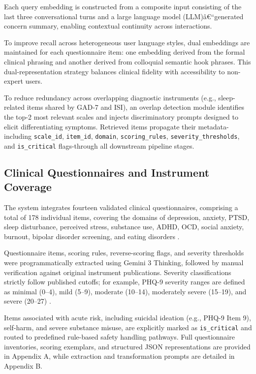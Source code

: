 ﻿\documentclass[acmsmall,screen]{acmart}
\begin{document}
Each query embedding is constructed from a composite input consisting of the last three conversational turns and a large language model (LLM)â€“generated concern summary, enabling contextual continuity across interactions.

To improve recall across heterogeneous user language styles, dual embeddings are maintained for each questionnaire item: one embedding derived from the formal clinical phrasing and another derived from colloquial semantic hook phrases. This dual-representation strategy balances clinical fidelity with accessibility to non-expert users.

To reduce redundancy across overlapping diagnostic instruments (e.g., sleep-related items shared by GAD-7 and ISI), an overlap detection module identifies the top-2 most relevant scales and injects discriminatory prompts designed to elicit differentiating symptoms. Retrieved items propagate their metadata-including \texttt{scale\_id}, \texttt{item\_id}, \texttt{domain}, \texttt{scoring\_rules}, \texttt{severity\_thresholds}, and \texttt{is\_critical} flags-through all downstream pipeline stages.

\subsection{Clinical Questionnaires and Instrument Coverage}
The system integrates fourteen validated clinical questionnaires, comprising a total of 178 individual items, covering the domains of depression, anxiety, PTSD, sleep disturbance, perceived stress, substance use, ADHD, OCD, social anxiety, burnout, bipolar disorder screening, and eating disorders \cite{24,25,26,27,28,29,30,31,32,33,34,35,36,37}.

Questionnaire items, scoring rules, reverse-scoring flags, and severity thresholds were programmatically extracted using Gemini 3 Thinking, followed by manual verification against original instrument publications. Severity classifications strictly follow published cutoffs; for example, PHQ-9 severity ranges are defined as minimal (0--4), mild (5--9), moderate (10--14), moderately severe (15--19), and severe (20--27) \cite{4}.

Items associated with acute risk, including suicidal ideation (e.g., PHQ-9 Item 9), self-harm, and severe substance misuse, are explicitly marked as \texttt{is\_critical} and routed to predefined rule-based safety handling pathways. Full questionnaire inventories, scoring exemplars, and structured JSON representations are provided in Appendix A, while extraction and transformation prompts are detailed in Appendix B.
\end{document}
